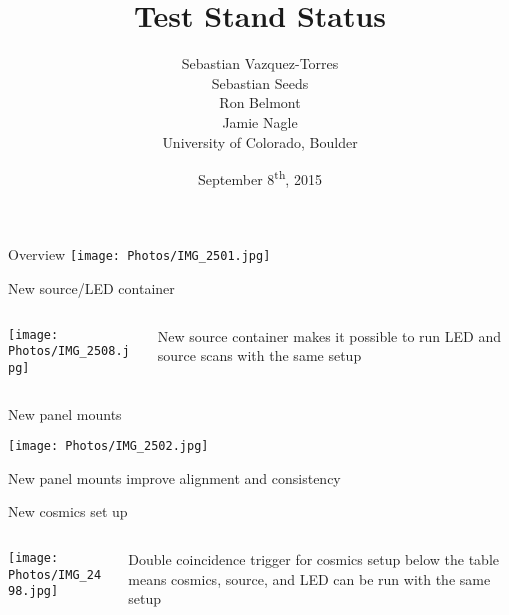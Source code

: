 \documentclass[compress,8pt]{beamer} %
\title[sPHENIX HCal meeting, Sept 8, 2015 - Slide \insertframenumber]{Test Stand Status}
\author[CU-Boulder]{Sebastian Vazquez-Torres \\ Sebastian Seeds \\ Ron Belmont \\ Jamie Nagle \\ \vspace{20pt} University of Colorado, Boulder}
\date{September 8\textsuperscript{th}, 2015}
\begin{document}
\begin{frame}
\titlepage
\end{frame}



\begin{frame}{Overview}
\texttt{[image: Photos/IMG\_2501.jpg]}
\end{frame}



\begin{frame}{New source/LED container}
\begin{columns}
\begin{column}{0.55\linewidth}
\texttt{[image: Photos/IMG\_2508.jpg]}
\end{column}
\begin{column}{0.45\linewidth}
New source container makes it possible to run LED and source scans with
the same setup
\end{column}
\end{columns}
\end{frame}




\begin{frame}{New panel mounts}
\begin{center}
\texttt{[image: Photos/IMG\_2502.jpg]}
\end{center}
New panel mounts improve alignment and consistency %
\end{frame}




\begin{frame}{New cosmics set up}
\begin{columns}
\begin{column}{0.55\linewidth}
\texttt{[image: Photos/IMG\_2498.jpg]}
\end{column}
\begin{column}{0.45\linewidth}
Double coincidence trigger for cosmics
setup below the table means cosmics, source, and LED
can be run with the same setup
\end{column}
\end{columns}
\end{frame}
\end{document}
